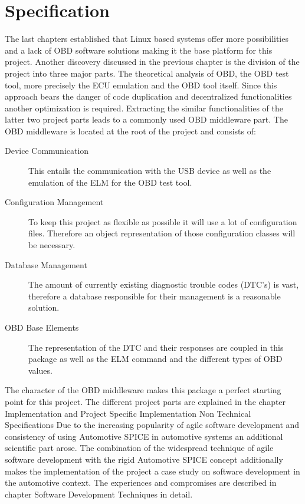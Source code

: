 
\chapter{Specification}
The last chapters established that Linux based systems offer more possibilities and a lack of OBD software solutions making it the base platform for this project. Another discovery discussed in the previous chapter is the division of the project into three major parts. The theoretical analysis of OBD, the OBD test tool, more precisely the ECU emulation and the OBD tool itself. Since this approach bears the danger of code duplication and decentralized functionalities another optimization is required.  Extracting the similar functionalities of the latter two project parts leads to a commonly used OBD middleware part. 
The OBD middleware is located at the root of the project and consists of:
\begin{description}
\item[Device Communication] \newline
This entails the communication with the USB device as well as the emulation of the ELM for the OBD test tool.
\item[Configuration Management]\newline
To keep this project as flexible as possible it will use a lot of configuration files. Therefore an object representation of those configuration classes will be necessary.
\item[Database Management]\newline
The amount of currently existing diagnostic trouble codes (DTC’s) is vast, therefore a database responsible for their management is a reasonable solution.
\item[OBD Base Elements]\newline
The representation of the DTC and their responses are coupled in this package as well as the ELM command and the different types of OBD values.
\end{description}

The character of the OBD middleware makes this package a perfect starting point for this project. 
The different project parts are explained in the chapter Implementation and Project Specific Implementation
Non Technical Specifications
Due to the increasing popularity of agile software development and consistency of using Automotive SPICE in automotive systems an additional scientific part arose. The combination of  the  widespread technique of agile software development with the  rigid Automotive SPICE concept additionally makes the implementation of the project a case study on software development in the automotive context. The experiences and compromises are described in chapter Software Development Techniques  in detail. 

